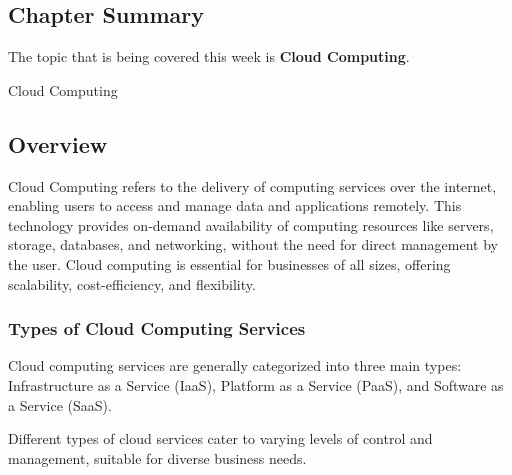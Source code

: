 \newpage

\subsection{Chapter Summary}

The topic that is being covered this week is \textbf{Cloud Computing}.

\begin{notes}{Cloud Computing}
    \subsection*{Overview}

    Cloud Computing refers to the delivery of computing services over the internet, enabling users to access and manage data and applications remotely. This technology provides on-demand availability 
    of computing resources like servers, storage, databases, and networking, without the need for direct management by the user. Cloud computing is essential for businesses of all sizes, offering 
    scalability, cost-efficiency, and flexibility.
    
    \subsubsection*{Types of Cloud Computing Services}
    
    Cloud computing services are generally categorized into three main types: Infrastructure as a Service (IaaS), Platform as a Service (PaaS), and Software as a Service (SaaS).
    
    \begin{highlight}
    
        Different types of cloud services cater to varying levels of control and management, suitable for diverse business needs.
        

\end{highlight}
\end{notes}
